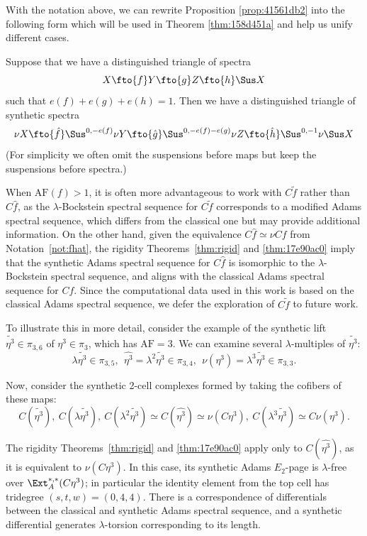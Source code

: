 \documentclass{amsart}
\numberwithin{equation}{section}
\newcommand{\AF}{\mathrm{AF}}
\begin{document}
With the notation above, we can rewrite Proposition \ref{prop:41561db2} into the following form which will be used in Theorem \ref{thm:158d451a} and help us unify different cases.

\begin{proposition}
    Suppose that we have a distinguished triangle of spectra
    $$X\fto{f} Y\fto{g} Z\fto{h} \Sus X$$
    such that $e(f)+e(g)+e(h)=1$. Then we have a distinguished triangle of synthetic spectra
    $$\nu X\fto{\hat f} \Sus^{0,-e(f)}\nu Y\fto{\hat g} \Sus^{0,-e(f)-e(g)}\nu Z\fto{\hat h} \Sus^{0,-1}\nu \Sus X$$
    (For simplicity we often omit the suspensions before maps but keep the suspensions before spectra.)
\end{proposition}

\begin{remark}
    When $\AF(f)>1$, it is often more advantageous to work with $C\tilde f$ rather than $C\hat f$, as the $\lambda$-Bockstein spectral sequence for $C\tilde f$ corresponds to a modified Adams spectral sequence, which differs from the classical one but may provide additional information. On the other hand, given the equivalence  $C\hat{f}\simeq \nu Cf$ from Notation~\ref{not:fhat}, the rigidity Theorems~\ref{thm:rigid} and \ref{thm:17e90ac0} imply that the synthetic Adams spectral sequence for $C\hat f$ is isomorphic to the $\lambda$-Bockstein spectral sequence, and aligns with the classical Adams spectral sequence for $Cf$.  Since the computational data used in this work is based on the classical Adams spectral sequence, we defer the exploration of $C\tilde f$ to future work.
    
    To illustrate this in more detail, consider the example of the synthetic lift $\tilde{\eta^3} \in \pi_{3,6}$ of $\eta^3 \in \pi_3$, which has $\AF = 3$. We can examine several $\lambda$-multiples of $\tilde{\eta^3}$:
    $$\lambda \tilde{\eta^3} \in \pi_{3,5}, \ \ \hat{\eta^3} = \lambda^2 \tilde{\eta^3} \in \pi_{3,4}, \ \ \nu(\eta^3) = \lambda^3 \tilde{\eta^3} \in \pi_{3,3}.$$

   Now, consider the synthetic 2-cell complexes formed by taking the cofibers of these maps:
    $$C(\tilde{\eta^3}), \ C(\lambda\tilde{\eta^3}), \ C(\lambda^2\tilde{\eta^3}) \simeq C(\hat{\eta^3}) \simeq \nu (C\eta^3), \ C(\lambda^3\tilde{\eta^3}) \simeq C\nu(\eta^3).$$

    The rigidity Theorems~\ref{thm:rigid} and \ref{thm:17e90ac0} apply only to $C(\hat{\eta^3})$, as it is equivalent to $\nu (C\eta^3)$. In this case, its synthetic Adams $E_2$-page is $\lambda$-free over $\Ext_A^{*,*}(C\eta^3)$; in particular the identity element from the top cell has tridegree $(s,t,w) = (0,4,4)$. There is a correspondence of differentials between the classical and synthetic Adams spectral sequence, and a synthetic differential generates $\lambda$-torsion corresponding to its length.


\end{remark}
\end{document}
